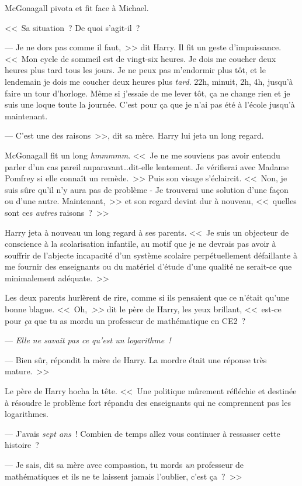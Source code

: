 McGonagall pivota et fit face à Michael.

<<~Sa situation~? De quoi s'agit-il~?

--- Je ne dors pas comme il faut,~>> dit Harry. Il fit un geste d'impuissance. <<~Mon cycle de sommeil est de vingt-six heures. Je dois me coucher deux heures plus tard tous les jours. Je ne peux pas m'endormir plus tôt, et le lendemain je dois me coucher deux heures plus \emph{tard}. 22h, minuit, 2h, 4h, jusqu'à faire un tour d'horloge. Même si j'essaie de me lever tôt, ça ne change rien et je suis une loque toute la journée. C'est pour ça que je n'ai pas été à l'école jusqu'à maintenant.

--- C'est une des raisons~>>, dit sa mère. Harry lui jeta un long regard.

McGonagall fit un long \emph{hmmmmm}. <<~Je ne me souviens pas avoir entendu parler d'un cas pareil auparavant\ldots dit-elle lentement. Je vérifierai avec Madame Pomfrey si elle connaît un remède.~>> Puis son visage s'éclaircit. <<~Non, je suis sûre qu'il n'y aura pas de problème - Je trouverai une solution d'une façon ou d'une autre. Maintenant,~>> et son regard devint dur à nouveau, <<~quelles sont ces \emph{autres} raisons~?~>>

Harry jeta à nouveau un long regard à ses parents. <<~Je suis un objecteur de conscience à la scolarisation infantile, au motif que je ne devrais pas avoir à souffrir de l'abjecte incapacité d'un système scolaire perpétuellement défaillante à me fournir des enseignants ou du matériel d'étude d'une qualité ne serait-ce que minimalement adéquate.~>>

Les deux parents hurlèrent de rire, comme si ils pensaient que ce n'était qu'une bonne blague. <<~Oh,\emph{~>>} dit le père de Harry, les yeux brillant, <<~est-ce pour \emph{ça} que tu as mordu un professeur de mathématique en CE2~?

--- \emph{Elle ne savait pas ce qu'est un logarithme~!}

--- Bien sûr, répondit la mère de Harry. La mordre était une réponse très mature.~>>

Le père de Harry hocha la tête. <<~Une politique mûrement réfléchie et destinée à résoudre le problème fort répandu des enseignants qui ne comprennent pas les logarithmes.

--- J'avais \emph{sept ans}~! Combien de temps allez vous continuer à ressasser cette histoire~?

--- Je sais, dit sa mère avec compassion, tu mords \emph{un} professeur de mathématiques et ils ne te laissent jamais l'oublier, c'est ça~?~>>

